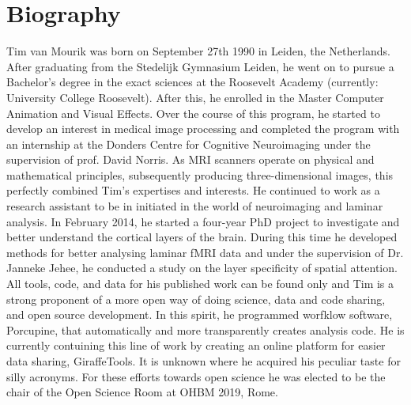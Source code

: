 \section{Biography}
Tim van Mourik was born on September 27th 1990 in Leiden, the Netherlands. After graduating from the Stedelijk Gymnasium Leiden, he went on to pursue a Bachelor's degree in the exact sciences at the Roosevelt Academy (currently: University College Roosevelt). After this, he enrolled in the Master Computer Animation and Visual Effects. Over the course of this program, he started to develop an interest in medical image processing and completed the program with an internship at the Donders Centre for Cognitive Neuroimaging under the supervision of prof. David Norris. As MRI scanners operate on physical and mathematical principles, subsequently producing three-dimensional images, this perfectly combined Tim's expertises and interests. He continued to work as a research assistant to be in initiated in the world of neuroimaging and laminar analysis. In February 2014, he started a four-year PhD project to investigate and better understand the cortical layers of the brain. During this time he developed methods for better analysing laminar fMRI data and under the supervision of Dr. Janneke Jehee, he conducted a study on the layer specificity of spatial attention. All tools, code, and data for his published work can be found only and Tim is a strong proponent of a more open way of doing science, data and code sharing, and open source development. In this spirit, he programmed worfklow software, Porcupine, that automatically and more transparently creates analysis code. He is currently contuining this line of work by creating an online platform for easier data sharing, GiraffeTools. It is unknown where he acquired his peculiar taste for silly acronyms. For these efforts towards open science he was elected to be the chair of the Open Science Room at OHBM 2019, Rome. 
